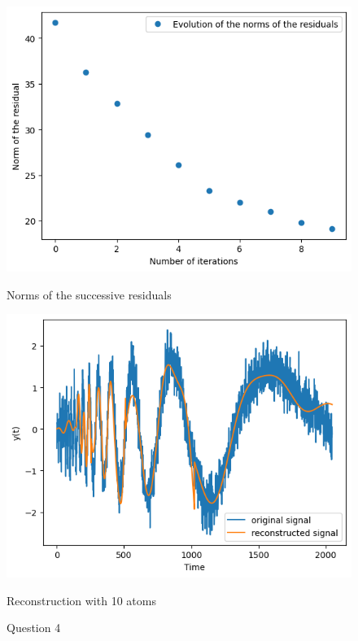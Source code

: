 \documentclass[11pt]{article}
\begin{document}
\begin{solution}


\begin{figure}
    \centering
    \begin{minipage}[t]{0.45\textwidth}
    \centerline{\includegraphics[width=\textwidth]{images/q4_1}}
    \centerline{Norms of the successive residuals}
    \end{minipage}
    \hfill
    \begin{minipage}[t]{0.45\textwidth}    \centerline{\includegraphics[width=\textwidth]{images/q4_2}}
    \centerline{Reconstruction with 10 atoms}
    \end{minipage}
    \caption{Question 4}
\end{figure}



\end{solution}
\end{document}
